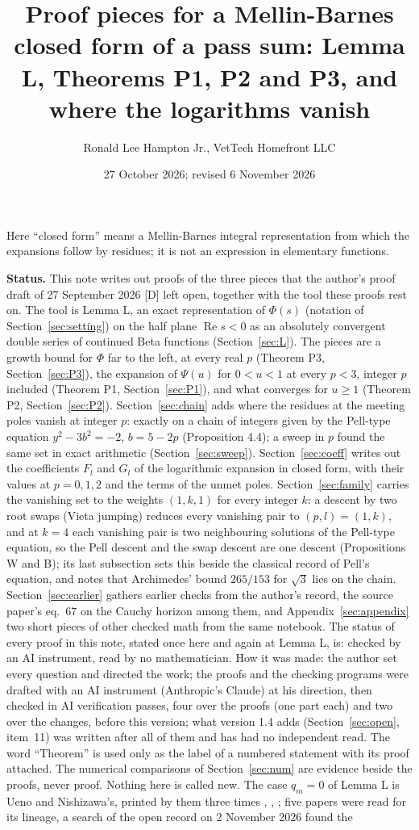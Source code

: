 \documentclass[11pt]{article}
\title{Proof pieces for a Mellin-Barnes closed form of a pass sum: Lemma L, Theorems P1, P2 and P3, and where the logarithms vanish}
\author{Ronald Lee Hampton Jr., VetTech Homefront LLC}
\date{27 October 2026; revised 6 November 2026}
\newcommand{\re}{\operatorname{Re}}
\begin{document}
\maketitle

\noindent Here ``closed form'' means a Mellin-Barnes integral representation from which the expansions follow by residues; it is not an expression in elementary functions.

\medskip
\noindent\textbf{Status.} This note writes out proofs of the three pieces that the author's proof draft of 27 September 2026 [D] left open, together with the tool these proofs rest on. The tool is Lemma L, an exact representation of $\Phi(s)$ (notation of Section~\ref{sec:setting}) on the half plane $\re s<0$ as an absolutely convergent double series of continued Beta functions (Section~\ref{sec:L}). The pieces are a growth bound for $\Phi$ far to the left, at every real $p$ (Theorem P3, Section~\ref{sec:P3}), the expansion of $\Psi(u)$ for $0<u<1$ at every $p<3$, integer $p$ included (Theorem P1, Section~\ref{sec:P1}), and what converges for $u\ge1$ (Theorem P2, Section~\ref{sec:P2}). Section~\ref{sec:chain} adds where the residues at the meeting poles vanish at integer $p$: exactly on a chain of integers given by the Pell-type equation $y^2-3b^2=-2$, $b=5-2p$ (Proposition 4.4); a sweep in $p$ found the same set in exact arithmetic (Section~\ref{sec:sweep}). Section~\ref{sec:coeff} writes out the coefficients $F_l$ and $G_l$ of the logarithmic expansion in closed form, with their values at $p=0,1,2$ and the terms of the unmet poles. Section~\ref{sec:family} carries the vanishing set to the weights $(1,k,1)$ for every integer $k$: a descent by two root swaps (Vieta jumping) reduces every vanishing pair to $(p,l)=(1,k)$, and at $k=4$ each vanishing pair is two neighbouring solutions of the Pell-type equation, so the Pell descent and the swap descent are one descent (Propositions W and B); its last subsection sets this beside the classical record of Pell's equation, and notes that Archimedes' bound $265/153$ for $\sqrt3$ lies on the chain. Section~\ref{sec:earlier} gathers earlier checks from the author's record, the source paper's eq.~67 on the Cauchy horizon among them, and Appendix~\ref{sec:appendix} two short pieces of other checked math from the same notebook. The status of every proof in this note, stated once here and again at Lemma L, is: checked by an AI instrument, read by no mathematician. How it was made: the author set every question and directed the work; the proofs and the checking programs were drafted with an AI instrument (Anthropic's Claude) at his direction, then checked in AI verification passes, four over the proofs (one part each) and two over the changes, before this version; what version 1.4 adds (Section~\ref{sec:open}, item~11) was written after all of them and has had no independent read. The word ``Theorem'' is used only as the label of a numbered statement with its proof attached. The numerical comparisons of Section~\ref{sec:num} are evidence beside the proofs, never proof. Nothing here is called new. The case $q_m=0$ of Lemma L is Ueno and Nishizawa's, printed by them three times \cite{UN}, \cite{UN2}, \cite{UN3}; five papers were read for its lineage, a search of the open record on 2 November 2026 found the 
\end{document}
